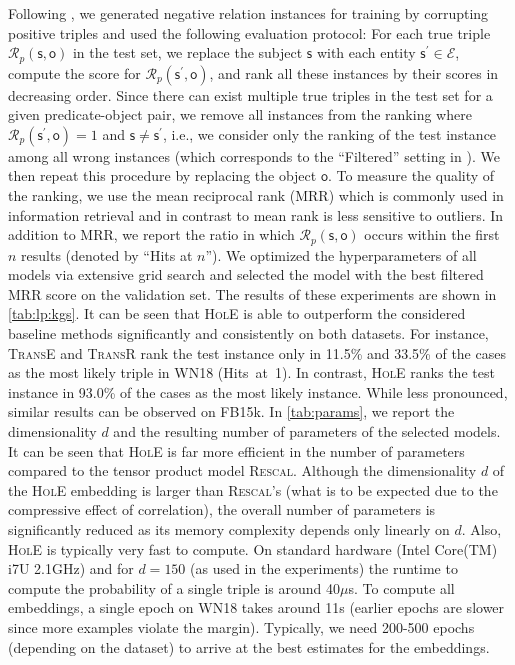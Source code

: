 \documentclass[letterpaper]{article}
\newcommand{\hole}{\textsc{HolE}\xspace}
\newcommand{\transe}{\textsc{TransE}\xspace}
\newcommand{\transr}{\textsc{TransR}\xspace}
\newcommand{\rescal}{\textsc{Rescal}\xspace}
\newcommand{\Set}[1]{\mathcal{#1}}
\newcommand{\SE}{\Set{E}}
\newcommand{\SR}{\Set{R}}
\newcommand{\Ss}{\textsf{s}}
\newcommand{\So}{\textsf{o}}
\begin{document}
Following \citet{bordes2013translating}, we generated negative relation
instances for training by corrupting positive triples and used the
following evaluation protocol: For each true triple $\SR_p(\Ss, \So)$
in the test set, we replace the subject $\Ss$ with each entity $\Ss^\prime \in
\SE$, compute the score for $\SR_p(\Ss^\prime, \So)$, and rank all these instances
by their scores in decreasing order. Since there can exist multiple true
triples in the test set for a given predicate-object pair, we remove
all instances from the ranking where $\SR_p(\Ss^\prime, \So) = 1$ and ${\Ss \neq
  \Ss^\prime}$, i.e., we consider only the ranking of the test
instance among all wrong instances (which corresponds to the ``Filtered''
setting in \citet{bordes2013translating}). We then repeat this procedure by
replacing the object $\So$. To measure the quality of the ranking, we use the
mean reciprocal rank (MRR) which is commonly used in information retrieval
and in contrast to mean rank is less sensitive to outliers.
In addition to MRR, we report the ratio in which $\SR_p(\Ss, \So)$
occurs within the first $n$ results (denoted by ``Hits at $n$'').
We optimized the hyperparameters of all models via extensive grid search and
selected the model with the best filtered MRR score on the validation set.
The results of these experiments are shown in \cref{tab:lp:kgs}.
It can be seen that \hole is able to outperform the considered baseline methods
significantly and consistently on both datasets. For instance, \transe and
\transr rank the test instance only in 11.5\% and 33.5\% of the cases as the
most likely triple in WN18 (\mbox{Hits at 1}). In contrast, \hole ranks the test
instance in 93.0\% of the cases as the most likely instance. While less
pronounced, similar results can be observed on FB15k.
In \cref{tab:params}, we report the dimensionality $d$ and the resulting
number of parameters of the selected models. It can be seen that \hole is far
more efficient in the number of parameters compared to the tensor product model
\rescal. Although the dimensionality $d$ of the \hole embedding is larger than
\textsc{Rescal}'s (what is to be expected due to the compressive effect of
correlation), the overall number of parameters is significantly reduced as its
memory complexity depends only linearly on $d$.
Also, \hole is typically very fast to compute. On standard hardware (Intel
Core(TM) i7U 2.1GHz) and for $d=150$ (as used in the experiments) the runtime to
compute the probability of a single triple is around 40$ \mu$s. To compute all
embeddings, a single epoch on WN18 takes around 11s (earlier epochs are slower
since more examples violate the margin). Typically, we need 200-500 epochs
(depending on the dataset) to arrive at the best estimates for the embeddings.
\end{document}
